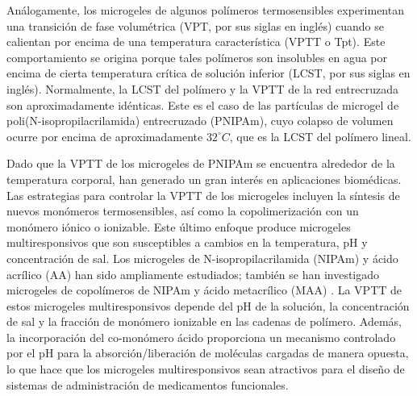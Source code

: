 An\'alogamente, los microgeles de algunos pol\'imeros termosensibles experimentan una transici\'on de fase volum\'etrica (VPT, por sus siglas en ingl\'es) cuando se calientan por encima de una temperatura caracter\'istica (VPTT o Tpt)\cite{Pelton1986,Pelton2000}.
Este comportamiento se origina porque tales pol\'imeros son insolubles en agua por encima de cierta temperatura cr\'itica de soluci\'on inferior (LCST, por sus siglas en ingl\'es)\cite{Kawaguchi2020}.
Normalmente, la LCST del pol\'imero y la VPTT de la red entrecruzada son aproximadamente id\'enticas.
Este es el caso de las part\'iculas de microgel de poli(N-isopropilacrilamida) entrecruzado (PNIPAm)\cite{Pelton1986}, cuyo colapso de volumen ocurre por encima de aproximadamente $32 ^\circ C$, que es la LCST del pol\'imero lineal\cite{Schild1992}.

Dado que la VPTT de los microgeles de PNIPAm se encuentra alrededor de la temperatura corporal, han generado un gran inter\'es en aplicaciones biom\'edicas\cite{Guan2011}.
Las estrategias para controlar la VPTT de los microgeles incluyen la síntesis de nuevos mon\'omeros termosensibles\cite{Cai2007,Macchione2019}, as\'i como la copolimerizaci\'on con un mon\'omero i\'onico o ionizable\cite{Hirose1987,Lopez2020}.
Este \'ultimo enfoque produce microgeles multiresponsivos que son susceptibles a cambios en la temperatura, pH y concentración de sal\cite{snowden1996colloidal,Farooqi2017}.
Los microgeles de N-isopropilacrilamida (NIPAm) y \'acido acr\'ilico (AA) han sido ampliamente estudiados\cite{Morris1997,Jones2000,Bradley2005,Begum2016}; tambi\'en se han investigado microgeles de copol\'imeros de NIPAm y \'acido metacr\'ilico (MAA) \cite{Dowding2000,Hoare2004,Giussi2015}.
La VPTT de estos microgeles multiresponsivos depende del pH de la soluci\'on, la concentraci\'on de sal y la fracci\'on de mon\'omero ionizable en las cadenas de polímero\cite{Morris1997,Jones2000,Hoare2004,Bradley2005,Lee2008,Wong2009,Hamzavi2016}.
Adem\'as, la incorporaci\'on del co-mon\'omero \'acido proporciona un mecanismo controlado por el pH para la absorci\'on/liberaci\'on de mol\'eculas cargadas de manera opuesta, lo que hace que los microgeles multiresponsivos sean atractivos para el dise\~no de sistemas de administraci\'on de medicamentos funcionales\cite{Liu2017}.

